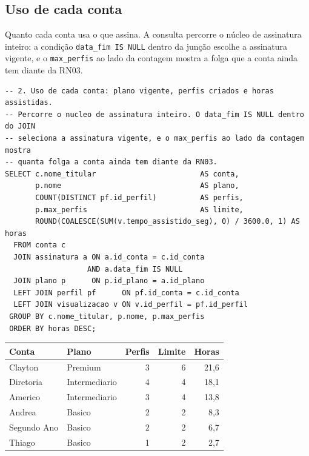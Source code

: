 \documentclass[a4paper,12pt,oneside,openany]{book}
\newcommand{\bd}[1]{\texttt{#1}}
\begin{document}
\subsection{Uso de cada conta}

Quanto cada conta usa o que assina. A consulta percorre o núcleo de
assinatura inteiro: a condição \bd{data\_fim IS NULL} dentro da junção escolhe
a assinatura vigente, e o \bd{max\_perfis} ao lado da contagem mostra a folga
que a conta ainda tem diante da RN03.

\begin{lstlisting}[caption={Uso de cada conta.},label={lst:consulta2},basicstyle=\ttfamily\scriptsize]
-- 2. Uso de cada conta: plano vigente, perfis criados e horas assistidas.
-- Percorre o nucleo de assinatura inteiro. O data_fim IS NULL dentro do JOIN
-- seleciona a assinatura vigente, e o max_perfis ao lado da contagem mostra
-- quanta folga a conta ainda tem diante da RN03.
SELECT c.nome_titular                        AS conta,
       p.nome                                AS plano,
       COUNT(DISTINCT pf.id_perfil)          AS perfis,
       p.max_perfis                          AS limite,
       ROUND(COALESCE(SUM(v.tempo_assistido_seg), 0) / 3600.0, 1) AS horas
  FROM conta c
  JOIN assinatura a ON a.id_conta = c.id_conta
                   AND a.data_fim IS NULL
  JOIN plano p      ON p.id_plano = a.id_plano
  LEFT JOIN perfil pf      ON pf.id_conta = c.id_conta
  LEFT JOIN visualizacao v ON v.id_perfil = pf.id_perfil
 GROUP BY c.nome_titular, p.nome, p.max_perfis
 ORDER BY horas DESC;
\end{lstlisting}

\begin{table}[ht]
\centering
\begin{tabular}{llrrr}
\toprule
\textbf{Conta} & \textbf{Plano} & \textbf{Perfis} & \textbf{Limite} & \textbf{Horas} \\
\midrule
Clayton     & Premium       & 3 & 6 & 21,6 \\
Diretoria   & Intermediario & 4 & 4 & 18,1 \\
Americo     & Intermediario & 3 & 4 & 13,8 \\
Andrea      & Basico        & 2 & 2 &  8,3 \\
Segundo Ano & Basico        & 2 & 2 &  6,7 \\
Thiago      & Basico        & 1 & 2 &  2,7 \\
\bottomrule
\end{tabular}
\end{table}
\end{document}
